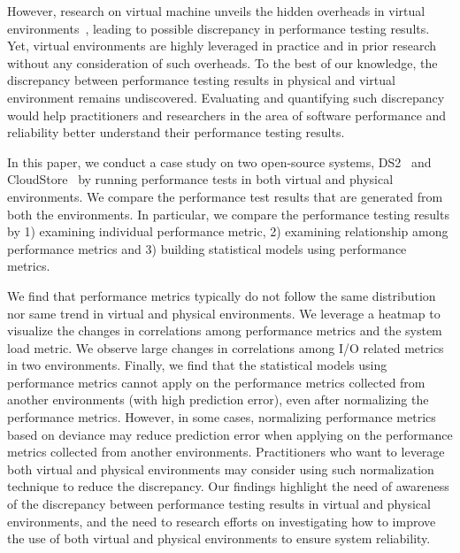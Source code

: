 However, research on virtual machine unveils the hidden overheads in virtual environments~\cite{menon2005diagnosing}, leading to possible discrepancy in performance testing results. Yet, virtual environments are highly leveraged in practice and in prior research~\cite{Nguyen:2012:ADP:2188286.2188344,xiong2013vperfguard} without any consideration of such overheads. To the best of our knowledge, the discrepancy between performance testing results in physical and virtual environment remains undiscovered. Evaluating and quantifying such discrepancy would help practitioners and researchers in the area of software performance and reliability better understand their performance testing results.


In this paper, we conduct a case study on two open-source systems, DS2~\cite{delldvd} and CloudStore~\cite{cloudstore} by running performance tests in both virtual and physical environments. We compare the performance test results that are generated from both the environments. In particular, we compare the performance testing results by 1) examining individual performance metric, 2) examining relationship among performance metrics and 3) building statistical models using performance metrics. 

We find that performance metrics typically do not follow the same distribution nor same trend in virtual and physical environments. We leverage a heatmap to visualize the changes in correlations among performance metrics and the system load metric. We observe large changes in correlations among I/O related metrics in two environments. Finally, we find that the statistical models using performance metrics cannot apply on the performance metrics collected from another environments (with high prediction error), even after normalizing the performance metrics. However, in some cases, normalizing performance metrics based on deviance may reduce prediction error when applying on the performance metrics collected from another environments. Practitioners who want to leverage both virtual and physical environments may consider using such normalization technique to reduce the discrepancy. Our findings highlight the need of awareness of the discrepancy between performance testing results in virtual and physical environments, and the need to research efforts on investigating how to improve the use of both virtual and physical environments to ensure system reliability.

